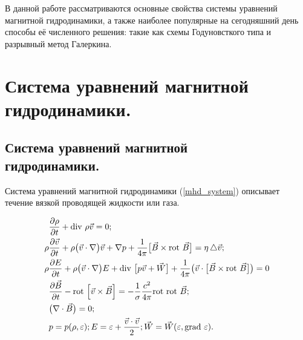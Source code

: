 \documentclass[14pt, a4paper, fleqn]{extreport}
\begin{document}
	В данной работе рассматриваются основные свойства 
	системы уравнений магнитной гидродинамики,
	а также наиболее популярные на сегодняшний день способы её численного решения:
	такие как схемы Годуновсткого типа и разрывный метод Галеркина.
		
	\chapter{Система уравнений магнитной гидродинамики.}
	
	\section{Система уравнений магнитной \\
		     гидродинамики.}
	
	Система уравнений магнитной гидродинамики (\ref{mhd_system}) описывает
	течение вязкой проводящей жидкости или газа.
	
	\begin{equation}
	\label{mhd_system}
	\begin{split}
		&\dfrac{\partial \rho}{\partial t}
			+ \text{div }{ \rho\vec{v} } = 0; \\
		\rho&\dfrac{\partial \vec{v}}{\partial t}
			+ \rho\big( \vec{v} \cdot \nabla \big) \vec{v} + \nabla p
			+ \dfrac{1}{4\pi}\big[ \vec{B} \times \text{rot }{\vec{B}} \big]
			= \eta\mathop{}\!\mathbin\bigtriangleup \vec{v}; \\
		\rho&\dfrac{\partial E}{\partial t} 
			+ \rho\big( \vec{v} \cdot \nabla \big)E
			+ \text{div }{\big[ p\vec{v} + \vec{W} \big]} 
			+ \dfrac{1}{4\pi} \big( \vec{v} \cdot \big[ \vec{B} \times \text{rot }{\vec{B}} \big] \big) = 0\\			
		&\dfrac{\partial \vec{B}}{\partial t}
			- \text{rot }{\Big[ \vec{v} \times \vec{B} \Big]}
			= -\dfrac{1}{\sigma}\dfrac{c^2}{4\pi}\text{rot }{\text{rot }{\vec{B}}}; \\
		&\big( \nabla \cdot \vec{B} \big) = 0; \\
		&p = p(\rho, \varepsilon); 
		 E = \varepsilon + \dfrac{\vec{v} \cdot \vec{v}}{2}; 
		 \vec{W} = \vec{W}(\varepsilon, \text{grad }{\varepsilon}).
	\end{split}
	\end{equation}
	
\end{document}
